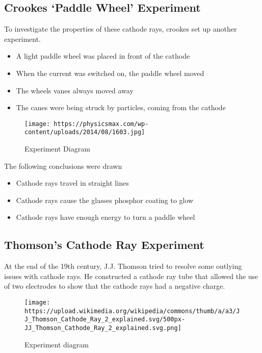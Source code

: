 \hypertarget{crookes-paddle-wheel-experiment}{%
\subsection{Crookes `Paddle Wheel'
Experiment}\label{crookes-paddle-wheel-experiment}}

To investigate the properties of these cathode rays, crookes set up
another experiment.

\begin{itemize}
\tightlist
\item
  A light paddle wheel was placed in front of the cathode
\item
  When the current was switched on, the paddle wheel moved
\item
  The wheels vanes always moved away
\item
  The canes were being struck by particles, coming from the cathode
\end{itemize}

\begin{figure}
\centering
\texttt{[image: https://physicsmax.com/wp-content/uploads/2014/08/1603.jpg]}
\caption{Experiment Diagram}
\end{figure}

The following conclusions were drawn

\begin{itemize}
\tightlist
\item
  Cathode rays travel in straight lines
\item
  Cathode rays cause the glasses phosphor coating to glow
\item
  Cathode rays have enough energy to turn a paddle wheel
\end{itemize}

\hypertarget{thomsons-cathode-ray-experiment}{%
\subsection{Thomson's Cathode Ray
Experiment}\label{thomsons-cathode-ray-experiment}}

At the end of the 19th century, J.J. Thomson tried to resolve some
outlying issues with cathode rays. He constructed a cathode ray tube
that allowed the use of two electrodes to show that the cathode rays had
a negative charge.

\begin{figure}
\centering
\texttt{[image: https://upload.wikimedia.org/wikipedia/commons/thumb/a/a3/JJ\_Thomson\_Cathode\_Ray\_2\_explained.svg/500px-JJ\_Thomson\_Cathode\_Ray\_2\_explained.svg.png]}
\caption{Experiment diagram}
\end{figure}

